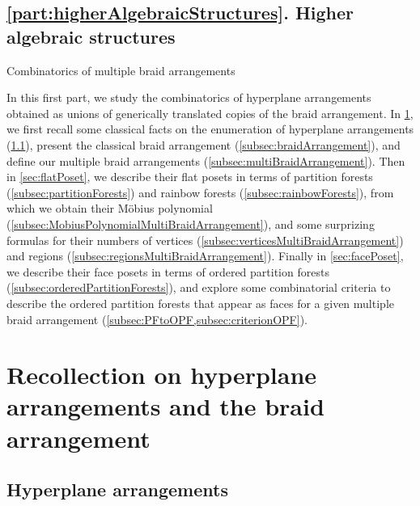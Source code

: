 \documentclass{amsart}
\makeatletter
\theoremstyle{definition}
\def\part{\@startsection{part}{1}%
\z@{.7\linespacing\@plus\linespacing}{.8\linespacing}%
{\LARGE\sffamily\centering}}
\makeatother
\begin{document}
\subsection*{\cref{part:higherAlgebraicStructures}. Higher algebraic structures}



\clearpage
\part{Combinatorics of multiple braid arrangements}
\label{part:multiBraidArrangements}

In this first part, we study the combinatorics of hyperplane arrangements obtained as unions of generically translated copies of the braid arrangement.
In \cref{sec:arrangements}, we first recall some classical facts on the enumeration of hyperplane arrangements (\cref{subsec:arrangements}), present the classical braid arrangement (\cref{subsec:braidArrangement}), and define our multiple braid arrangements (\cref{subsec:multiBraidArrangement}).
Then in \cref{sec:flatPoset}, we describe their flat posets in terms of partition forests (\cref{subsec:partitionForests}) and rainbow forests (\cref{subsec:rainbowForests}), from which we obtain their M\"obius polynomial (\cref{subsec:MobiusPolynomialMultiBraidArrangement}), and some surprizing formulas for their numbers of vertices (\cref{subsec:verticesMultiBraidArrangement}) and regions (\cref{subsec:regionsMultiBraidArrangement}).
Finally in \cref{sec:facePoset}, we describe their face posets in terms of ordered partition forests (\cref{subsec:orderedPartitionForests}), and explore some combinatorial criteria to describe the ordered partition forests that appear as faces for a given multiple braid arrangement (\cref{subsec:PFtoOPF,subsec:criterionOPF}).


\section{Recollection on hyperplane arrangements and the braid arrangement}
\label{sec:arrangements}


\subsection{Hyperplane arrangements}
\label{subsec:arrangements}
\end{document}

